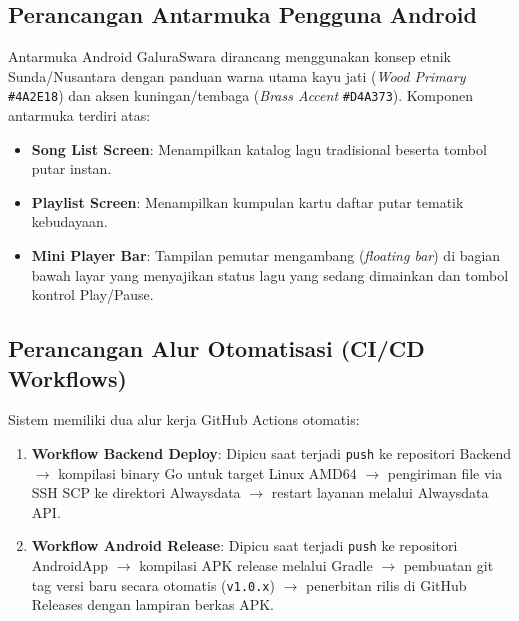 \subsection{Perancangan Antarmuka Pengguna Android}
Antarmuka Android GaluraSwara dirancang menggunakan konsep etnik Sunda/Nusantara dengan panduan warna utama kayu jati (\textit{Wood Primary} \texttt{\#4A2E18}) dan aksen kuningan/tembaga (\textit{Brass Accent} \texttt{\#D4A373}). Komponen antarmuka terdiri atas:
\begin{itemize}
    \item \textbf{Song List Screen}: Menampilkan katalog lagu tradisional beserta tombol putar instan.
    \item \textbf{Playlist Screen}: Menampilkan kumpulan kartu daftar putar tematik kebudayaan.
    \item \textbf{Mini Player Bar}: Tampilan pemutar mengambang (\textit{floating bar}) di bagian bawah layar yang menyajikan status lagu yang sedang dimainkan dan tombol kontrol Play/Pause.
\end{itemize}

\subsection{Perancangan Alur Otomatisasi (CI/CD Workflows)}
Sistem memiliki dua alur kerja GitHub Actions otomatis:
\begin{enumerate}
    \item \textbf{Workflow Backend Deploy}: Dipicu saat terjadi \texttt{push} ke repositori Backend $\rightarrow$ kompilasi binary Go untuk target Linux AMD64 $\rightarrow$ pengiriman file via SSH SCP ke direktori Alwaysdata $\rightarrow$ restart layanan melalui Alwaysdata API.
    \item \textbf{Workflow Android Release}: Dipicu saat terjadi \texttt{push} ke repositori AndroidApp $\rightarrow$ kompilasi APK release melalui Gradle $\rightarrow$ pembuatan git tag versi baru secara otomatis (\texttt{v1.0.x}) $\rightarrow$ penerbitan rilis di GitHub Releases dengan lampiran berkas APK.
\end{enumerate}
